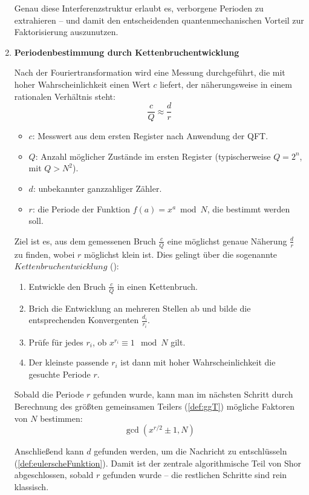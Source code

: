 \begin{enumerate}
\noindent Genau diese Interferenzstruktur erlaubt es, verborgene Perioden zu extrahieren – und damit den entscheidenden quantenmechanischen Vorteil zur Faktorisierung auszunutzen.\\

\item \textbf{Periodenbestimmung durch Kettenbruchentwicklung}

\noindent Nach der Fouriertransformation wird eine Messung durchgeführt, die mit hoher Wahrscheinlichkeit einen Wert \( c \) liefert, der näherungsweise in einem rationalen Verhältnis steht:
\[
\frac{c}{Q} \approx \frac{d}{r}
\]

\begin{itemize}
    \item \( c \): Messwert aus dem ersten Register nach Anwendung der QFT.
    \item \( Q \): Anzahl möglicher Zustände im ersten Register (typischerweise \( Q = 2^n \), mit \( Q > N^2 \)).
    \item \( d \): unbekannter ganzzahliger Zähler.
    \item \( r \): die Periode der Funktion \( f(a) = x^a \bmod N \), die bestimmt werden soll.
\end{itemize}

\noindent Ziel ist es, aus dem gemessenen Bruch \( \frac{c}{Q} \) eine möglichst genaue Näherung \( \frac{d}{r} \) zu finden, wobei \( r \) möglichst klein ist. Dies gelingt über die sogenannte \(Kettenbruchentwicklung\) (\cite[18-19]{shor_polynomial-time_1994}):

\begin{enumerate}
    \item Entwickle den Bruch \( \frac{c}{Q} \) in einen Kettenbruch.
    \item Brich die Entwicklung an mehreren Stellen ab und bilde die entsprechenden Konvergenten \( \frac{d_i}{r_i} \).
    \item Prüfe für jedes \( r_i \), ob \( x^{r_i} \equiv 1 \mod N \) gilt.
    \item Der kleinste passende \( r_i \) ist dann mit hoher Wahrscheinlichkeit die gesuchte Periode \( r \).
\end{enumerate}

\noindent Sobald die Periode \( r \) gefunden wurde, kann man im nächsten Schritt durch Berechnung des größten gemeinsamen Teilers (\ref{def:ggT}) mögliche Faktoren von \( N \) bestimmen:
\[
\gcd(x^{r/2} \pm 1, N)
\]

\noindent Anschließend kann \(d\) gefunden werden, um die Nachricht zu entschlüsseln (\ref{def:eulerscheFunktion}). Damit ist der zentrale algorithmische Teil von Shor abgeschlossen, sobald \( r \) gefunden wurde  – die restlichen Schritte sind rein klassisch.\\
\end{enumerate}

